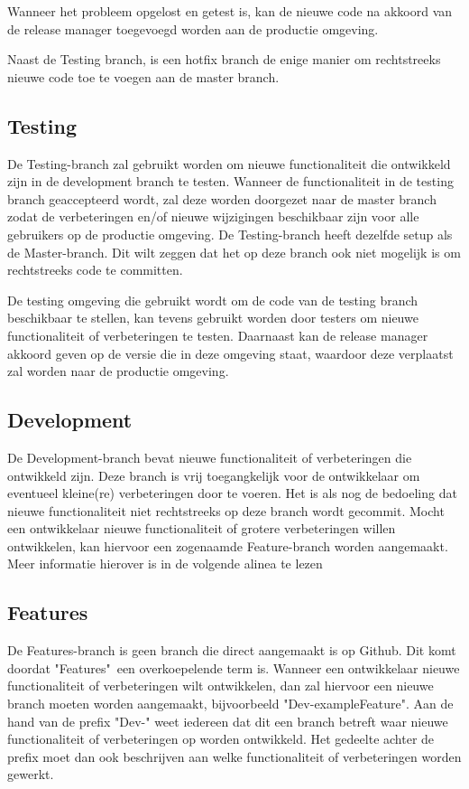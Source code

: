 	Wanneer het probleem opgelost en getest is, kan de nieuwe code na akkoord van de release manager toegevoegd worden aan de productie omgeving.
	
	Naast de Testing branch, is een hotfix branch de enige manier om rechtstreeks nieuwe code toe te voegen aan de master branch.
	
	\subsection{Testing}
	De Testing-branch zal gebruikt worden om nieuwe functionaliteit die ontwikkeld zijn in de development branch te testen. Wanneer de functionaliteit in de testing branch geaccepteerd wordt, zal deze worden doorgezet naar de master branch zodat de verbeteringen en/of nieuwe wijzigingen beschikbaar zijn voor alle gebruikers op de productie omgeving.
	De Testing-branch heeft dezelfde setup als de Master-branch. Dit wilt zeggen dat het op deze branch ook niet mogelijk is om rechtstreeks code te committen.
	
	De testing omgeving die gebruikt wordt om de code van de testing branch beschikbaar te stellen, kan tevens gebruikt worden door testers om nieuwe functionaliteit of verbeteringen te testen. Daarnaast kan de release manager akkoord geven op de versie die in deze omgeving staat, waardoor deze verplaatst zal worden naar de productie omgeving.
	\subsection{Development}
	
	De Development-branch bevat nieuwe functionaliteit of verbeteringen die ontwikkeld zijn. Deze branch is vrij toegangkelijk voor de ontwikkelaar om eventueel kleine(re) verbeteringen door te voeren.	
	Het is als nog de bedoeling dat nieuwe functionaliteit niet rechtstreeks op deze branch wordt gecommit. Mocht een ontwikkelaar nieuwe functionaliteit of grotere verbeteringen willen ontwikkelen, kan hiervoor een zogenaamde Feature-branch worden aangemaakt. Meer informatie hierover is in de volgende alinea te lezen
	
	\subsection{Features}
	De Features-branch is geen branch die direct aangemaakt is op Github. Dit komt doordat "Features"\ een overkoepelende term is. Wanneer een ontwikkelaar nieuwe functionaliteit of verbeteringen wilt ontwikkelen, dan zal hiervoor een nieuwe branch moeten worden aangemaakt, bijvoorbeeld "Dev-exampleFeature". Aan de hand van de prefix "Dev-" weet iedereen dat dit een branch betreft waar nieuwe functionaliteit of verbeteringen op worden ontwikkeld. Het gedeelte achter de prefix moet dan ook beschrijven aan welke functionaliteit of verbeteringen worden gewerkt.
	
